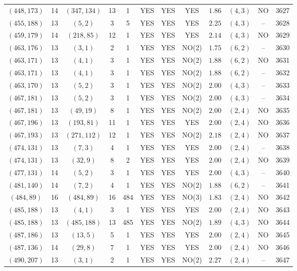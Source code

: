 \begin{longtable}{|c|c|c|c|c|c|c|c|c|c|c|c|}
$(448,173)$ & 14 & $(347,134)$ & 13 & 1 & YES & YES & YES & $1.86$ & $(4,3)$ & NO & 3627\\
$(455,188)$ & 13 & $(5,2)$ & 3 & 5 & YES & YES & YES & $2.25$ & $(4,3)$ & -- & 3628\\
$(459,179)$ & 14 & $(218,85)$ & 12 & 1 & YES & YES & YES & $2.14$ & $(4,3)$ & NO & 3629\\
$(463,176)$ & 13 & $(3,1)$ & 2 & 1 & YES & YES & NO(2) & $1.75$ & $(6,2)$ & -- & 3630\\
$(463,171)$ & 13 & $(4,1)$ & 3 & 1 & YES & YES & NO(2) & $1.88$ & $(6,2)$ & NO & 3631\\
$(463,171)$ & 13 & $(4,1)$ & 3 & 1 & YES & YES & NO(2) & $1.88$ & $(6,2)$ & -- & 3632\\
$(463,170)$ & 13 & $(5,2)$ & 3 & 1 & YES & YES & NO(2) & $2.00$ & $(4,3)$ & -- & 3633\\
$(467,181)$ & 13 & $(5,2)$ & 3 & 1 & YES & YES & NO(2) & $2.00$ & $(4,3)$ & -- & 3634\\
$(467,181)$ & 13 & $(49,19)$ & 8 & 1 & YES & YES & NO(2) & $2.00$ & $(2,4)$ & NO & 3635\\
$(467,196)$ & 13 & $(193,81)$ & 11 & 1 & YES & YES & YES & $2.00$ & $(2,4)$ & NO & 3636\\
$(467,193)$ & 13 & $(271,112)$ & 12 & 1 & YES & YES & NO(2) & $2.18$ & $(2,4)$ & NO & 3637\\
$(474,131)$ & 13 & $(7,3)$ & 4 & 1 & YES & YES & YES & $2.00$ & $(2,4)$ & -- & 3638\\
$(474,131)$ & 13 & $(32,9)$ & 8 & 2 & YES & YES & YES & $2.00$ & $(2,4)$ & NO & 3639\\
$(477,131)$ & 14 & $(5,2)$ & 3 & 1 & YES & YES & YES & $2.00$ & $(4,3)$ & -- & 3640\\
$(481,140)$ & 14 & $(7,2)$ & 4 & 1 & YES & YES & NO(2) & $1.88$ & $(6,2)$ & -- & 3641\\
$(484,89)$ & 16 & $(484,89)$ & 16 & 484 & YES & YES & NO(3) & $1.83$ & $(2,4)$ & NO & 3642\\
$(485,188)$ & 13 & $(4,1)$ & 3 & 1 & YES & YES & YES & $2.00$ & $(2,4)$ & NO & 3643\\
$(485,188)$ & 13 & $(485,188)$ & 13 & 485 & YES & YES & NO(2) & $1.89$ & $(4,3)$ & NO & 3644\\
$(487,186)$ & 13 & $(13,5)$ & 5 & 1 & YES & YES & YES & $2.00$ & $(2,4)$ & NO & 3645\\
$(487,136)$ & 14 & $(29,8)$ & 7 & 1 & YES & YES & YES & $2.00$ & $(2,4)$ & NO & 3646\\
$(490,207)$ & 13 & $(3,1)$ & 2 & 1 & YES & YES & NO(2) & $2.27$ & $(2,4)$ & -- & 3647\\

\end{longtable}
